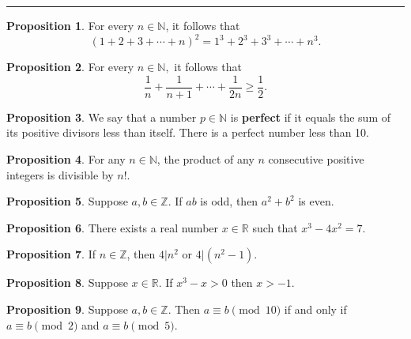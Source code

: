 \documentclass[11pt]{article}
\theoremstyle{definition}
\theoremstyle{theorem}
\newtheorem{proposition}{Proposition}
\begin{document}
\hrule

\begin{proposition}%
  For every $n\in\mathbb{N}$, it follows that
  \begin{equation*}
    (1+2+3+\dotsb+n)^2 = 1^3 + 2^3 + 3^3 + \dotsb + n^3.
  \end{equation*}
\end{proposition}

\begin{proposition}%
  For every $n \in \mathbb{N},$ it follows that 
  \begin{equation*}
    \frac{1}{n} + \frac{1}{n+1} + \dotsb + \frac{1}{2n} \geq \frac{1}{2}.
  \end{equation*}
\end{proposition}

\begin{proposition}%
  We say that a number $p \in \mathbb{N}$ is \textbf{perfect} if it equals the sum of its positive divisors less than
  itself.  There is a perfect number less than 10.
\end{proposition}

\begin{proposition}%
  For any $n \in \mathbb{N}$, the product of any $n$ consecutive positive integers is divisible by $n!.$
\end{proposition}

\begin{proposition}%
  Suppose $a, b \in \mathbb{Z}.$ If $ab$ is odd, then $a^2+b^2$ is even.
\end{proposition}

\begin{proposition}%
  There exists a real number $x \in \mathbb{R}$ such that $x^3-4x^2=7.$
\end{proposition}

\begin{proposition}%
  If $n \in \mathbb{Z}$, then $4 \vert n^2$ or $4 \vert (n^2-1).$
\end{proposition}

\begin{proposition}%
  Suppose $x \in \mathbb{R}.$  If $x^3-x>0$ then $x>-1.$
\end{proposition}

\begin{proposition}%
  Suppose $a, b \in \mathbb{Z}$.  Then $a \equiv b \pmod{10}$ if and only if $a \equiv b \pmod{2}$ and $a \equiv b \pmod{5}$.
\end{proposition}
\end{document}
